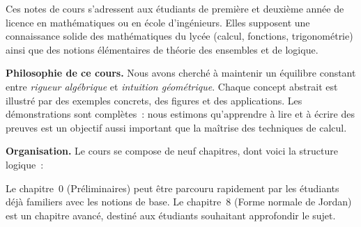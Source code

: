 \documentclass[a4paper,11pt,twoside,openright]{book}
\begin{document}
Ces notes de cours s'adressent aux étudiants de première et deuxième année de licence en mathématiques ou en école d'ingénieurs. Elles supposent une connaissance solide des mathématiques du lycée (calcul, fonctions, trigonométrie) ainsi que des notions élémentaires de théorie des ensembles et de logique.

\medskip

\noindent\textbf{Philosophie de ce cours.}
Nous avons cherché à maintenir un équilibre constant entre \emph{rigueur algébrique} et \emph{intuition géométrique}. Chaque concept abstrait est illustré par des exemples concrets, des figures et des applications. Les démonstrations sont complètes~: nous estimons qu'apprendre à lire et à écrire des preuves est un objectif aussi important que la maîtrise des techniques de calcul.

\medskip

\noindent\textbf{Organisation.}
Le cours se compose de neuf chapitres, dont voici la structure logique~:

\begin{center}
\end{center}

Le chapitre~0 (Préliminaires) peut être parcouru rapidement par les étudiants déjà familiers avec les notions de base. Le chapitre~8 (Forme normale de Jordan) est un chapitre avancé, destiné aux étudiants souhaitant approfondir le sujet.
\end{document}
